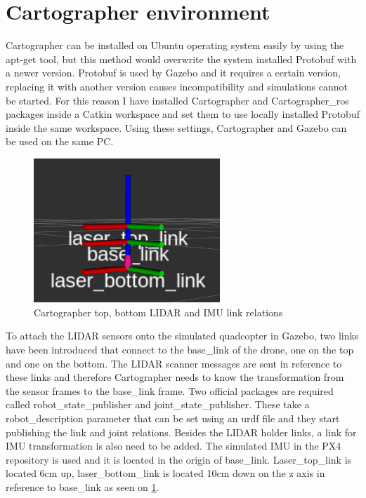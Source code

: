 \section{Cartographer environment} \label{sect:cartographer_environment}
Cartographer can be installed on Ubuntu operating system easily by using the apt-get tool, but this
method would overwrite the system installed Protobuf with a newer version. Protobuf is used by 
Gazebo and it requires a certain version, replacing it with another version causes incompatibility 
and simulations cannot be started. For this reason I have installed Cartographer and Cartographer\_ros
packages inside a Catkin workspace and set them to use locally installed Protobuf inside the same
workspace. Using these settings, Cartographer and Gazebo can be used on the same PC.

\begin{figure}[!ht]
    \centering
    \includegraphics[width=70mm, keepaspectratio]{figures/cartographer_tf_setup.png}
    \caption{Cartographer top, bottom LIDAR and IMU link relations}
    \label{fig:cartographer_tf_setup}
\end{figure}


To attach the LIDAR sensors onto the simulated quadcopter in Gazebo, two links have been introduced that
connect to the base\_link of the drone, one on the top and one on the bottom. The LIDAR scanner messages 
are sent in reference to these links and therefore Cartographer needs to know the transformation from the
sensor frames to the base\_link frame. Two official packages are required called robot\_state\_publisher
and joint\_state\_publisher. These take a robot\_description parameter that can be set using an urdf file 
and they start publishing the link and joint relations. Besides the LIDAR holder links, a link for IMU 
transformation is also need to be added. The simulated IMU in the PX4 repository is used and it is located in 
the origin of base\_link. Laser\_top\_link is located 6cm up, laser\_bottom\_link is located 10cm down
on the z axis in reference to base\_link as seen on \ref{fig:cartographer_tf_setup}.

